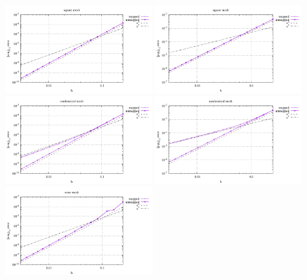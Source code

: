 \begin{center}
\includegraphics[width=6.5cm]{python_codes/fieldstone_76/results/bench3/straight/errors_V_mt1.pdf}
\includegraphics[width=6.5cm]{python_codes/fieldstone_76/results/bench3/straight/errors_P_mt1.pdf}\\
\includegraphics[width=6.5cm]{python_codes/fieldstone_76/results/bench3/straight/errors_V_mt2.pdf}
\includegraphics[width=6.5cm]{python_codes/fieldstone_76/results/bench3/straight/errors_P_mt2.pdf}\\
\includegraphics[width=6.5cm]{python_codes/fieldstone_76/results/bench3/straight/errors_V_mt3.pdf}

\end{center}

